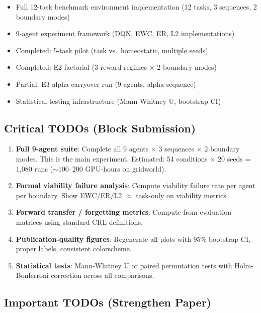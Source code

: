 \documentclass{article}
\begin{document}
\begin{itemize}[leftmargin=*]
  \item Full 12-task benchmark environment implementation (12 tasks,
        3 sequences, 2 boundary modes)
  \item 9-agent experiment framework (DQN, EWC, ER, L2 implementations)
  \item Completed: 5-task pilot (task vs.\ homeostatic, multiple seeds)
  \item Completed: E2 factorial (3 reward regimes $\times$ 2 boundary modes)
  \item Partial: E3 alpha-carryover run (9 agents, alpha sequence)
  \item Statistical testing infrastructure (Mann-Whitney U, bootstrap CI)
\end{itemize}

\subsection*{Critical TODOs (Block Submission)}

\begin{enumerate}[leftmargin=*]
  \item \textbf{Full 9-agent suite}: Complete all 9 agents $\times$
        3 sequences $\times$ 2 boundary modes. This is the main experiment.
        Estimated: 54 conditions $\times$ 20 seeds = 1,080 runs
        ($\sim$100--200 GPU-hours on gridworld).
  \item \textbf{Formal viability failure analysis}: Compute viability
        failure rate per agent per boundary. Show EWC/ER/L2 $\approx$
        task-only on viability metrics.
  \item \textbf{Forward transfer / forgetting metrics}: Compute from
        evaluation matrices using standard CRL definitions.
  \item \textbf{Publication-quality figures}: Regenerate all plots with
        95\% bootstrap CI, proper labels, consistent colorscheme.
  \item \textbf{Statistical tests}: Mann-Whitney U or paired permutation
        tests with Holm-Bonferroni correction across all comparisons.
\end{enumerate}

\subsection*{Important TODOs (Strengthen Paper)}
\end{document}
